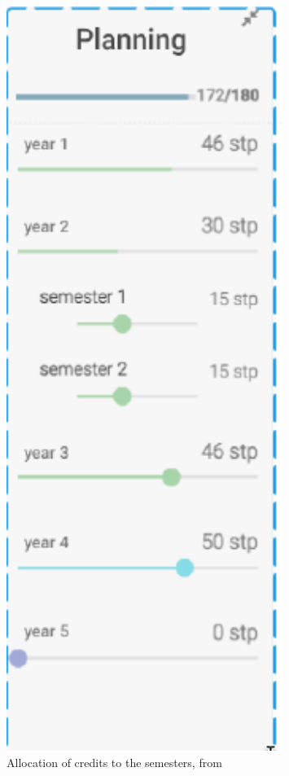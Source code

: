 \begin{figure}
    \centering
    \includegraphics[width=0.8\textwidth]{figures/planning_2.png}
    \caption{Allocation of credits to the semesters, from \cite{LissaLike-StudentSupport}}
    \label{fig:planning_2}
\end{figure}

